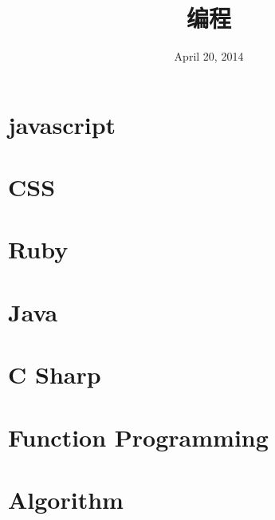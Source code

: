 \documentclass[12pt, oneside, b5paper]{book}
\title{编程}
\date{April 20, 2014}
\begin{document}
  
\maketitle

\part{javascript}


%










\part{CSS}


\part{Ruby}  


\part{Java}










\part{C Sharp}


\part{Function Programming}


\part{Algorithm}

\end{document}

